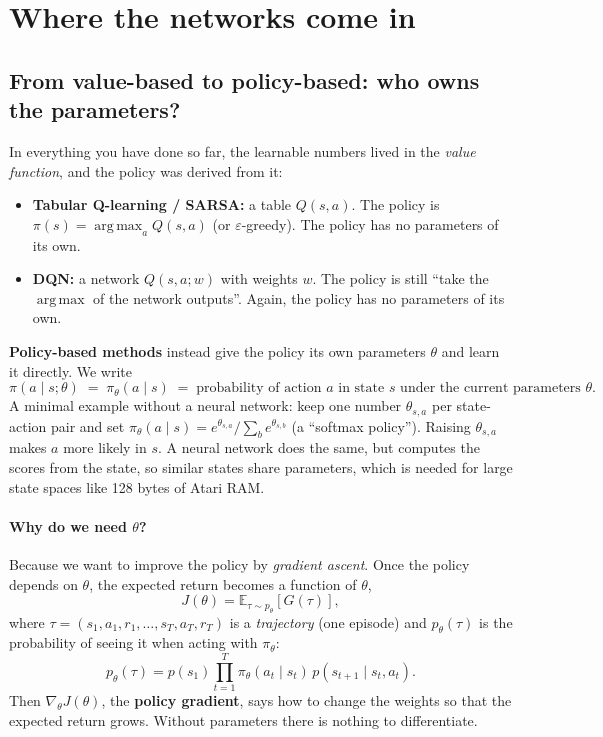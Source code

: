\documentclass[11pt,a4paper]{article}
\DeclareMathOperator{\argmax}{arg\,max}
\newcommand{\E}{\mathbb{E}}
\newcommand{\pit}{\pi_\theta}
\newcommand{\gradt}{\nabla_\theta}
\begin{document}
\section{Where the networks come in}\label{sec:networks}

\subsection{From value-based to policy-based: who owns the parameters?}
In everything you have done so far, the learnable numbers lived in the \emph{value function}, and the policy was derived from it:
\begin{itemize}[nosep]
  \item \textbf{Tabular Q-learning / SARSA:} a table $Q(s,a)$. The policy is $\pi(s)=\argmax_a Q(s,a)$ (or $\varepsilon$-greedy). The policy has no parameters of its own.
  \item \textbf{DQN:} a network $Q(s,a;w)$ with weights $w$. The policy is still \enquote{take the $\argmax$ of the network outputs}. Again, the policy has no parameters of its own.
\end{itemize}
\textbf{Policy-based methods} instead give the policy its own parameters $\theta$ and learn it directly. We write
\[
  \pi(a\mid s;\theta) \;=\; \pit(a\mid s) \;=\; \text{probability of action $a$ in state $s$ under the current parameters $\theta$}.
\]
A minimal example without a neural network: keep one number $\theta_{s,a}$ per state-action pair and set
$\pit(a\mid s) = e^{\theta_{s,a}}/\sum_b e^{\theta_{s,b}}$ (a \enquote{softmax policy}). Raising $\theta_{s,a}$ makes $a$ more likely in $s$. A neural network does the same, but computes the scores from the state, so similar states share parameters, which is needed for large state spaces like 128 bytes of Atari RAM.

\paragraph{Why do we need $\theta$?} Because we want to improve the policy by \emph{gradient ascent}. Once the policy depends on $\theta$, the expected return becomes a function of $\theta$,
\[
  J(\theta) = \E_{\tau\sim p_\theta}[G(\tau)],
\]
where $\tau=(s_1,a_1,r_1,\dots,s_T,a_T,r_T)$ is a \emph{trajectory} (one episode) and $p_\theta(\tau)$ is the probability of seeing it when acting with $\pit$:
\begin{equation}
  p_\theta(\tau) = p(s_1)\prod_{t=1}^{T} \pit(a_t\mid s_t)\, p(s_{t+1}\mid s_t,a_t).
  \label{eq:traj}
\end{equation}
Then $\gradt J(\theta)$, the \textbf{policy gradient}, says how to change the weights so that the expected return grows. Without parameters there is nothing to differentiate.
\end{document}
